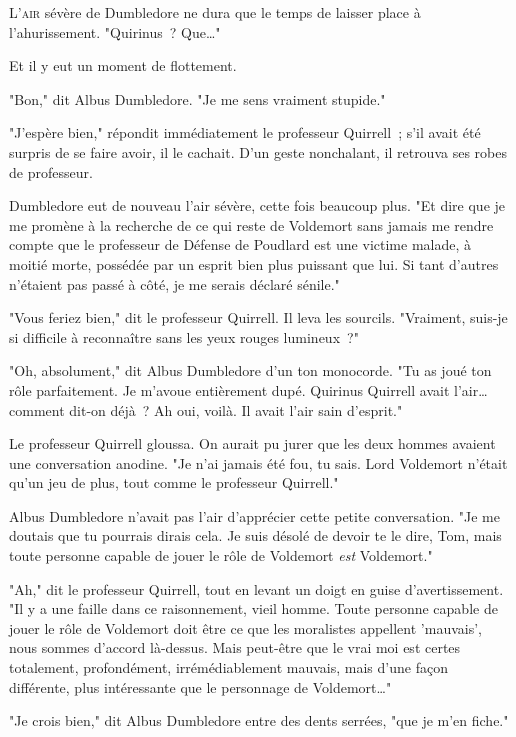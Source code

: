 
\lettrine{L}{'air} sévère de Dumbledore ne dura que le temps de laisser place à l'ahurissement. "Quirinus~? Que…"

Et il y eut un moment de flottement.

"Bon," dit Albus Dumbledore. "Je me sens vraiment stupide."

"J'espère bien," répondit immédiatement le professeur Quirrell~; s'il avait été surpris de se faire avoir, il le cachait. D'un geste nonchalant, il retrouva ses robes de professeur.

Dumbledore eut de nouveau l'air sévère, cette fois beaucoup plus. "Et dire que je me promène à la recherche de ce qui reste de Voldemort sans jamais me rendre compte que le professeur de Défense de Poudlard est une victime malade, à moitié morte, possédée par un esprit bien plus puissant que lui. Si tant d'autres n'étaient pas passé à côté, je me serais déclaré sénile."

"Vous feriez bien," dit le professeur Quirrell. Il leva les sourcils. "Vraiment, suis-je si difficile à reconnaître sans les yeux rouges lumineux~?"

"Oh, absolument," dit Albus Dumbledore d'un ton monocorde. "Tu as joué ton rôle parfaitement. Je m'avoue entièrement dupé. Quirinus Quirrell avait l'air… comment dit-on déjà~? Ah oui, voilà. Il avait l'air sain d'esprit."

Le professeur Quirrell gloussa. On aurait pu jurer que les deux hommes avaient une conversation anodine. "Je n'ai jamais été fou, tu sais. Lord Voldemort n'était qu'un jeu de plus, tout comme le professeur Quirrell."

Albus Dumbledore n'avait pas l'air d'apprécier cette petite conversation. "Je me doutais que tu pourrais dirais cela. Je suis désolé de devoir te le dire, Tom, mais toute personne capable de jouer le rôle de Voldemort \emph{est} Voldemort."

"Ah," dit le professeur Quirrell, tout en levant un doigt en guise d'avertissement. "Il y a une faille dans ce raisonnement, vieil homme. Toute personne capable de jouer le rôle de Voldemort doit être ce que les moralistes appellent 'mauvais', nous sommes d'accord là-dessus. Mais peut-être que le vrai moi est certes totalement, profondément, irrémédiablement mauvais, mais d'une façon différente, plus intéressante que le personnage de Voldemort…"

"Je crois bien," dit Albus Dumbledore entre des dents serrées, "que je m'en fiche."

